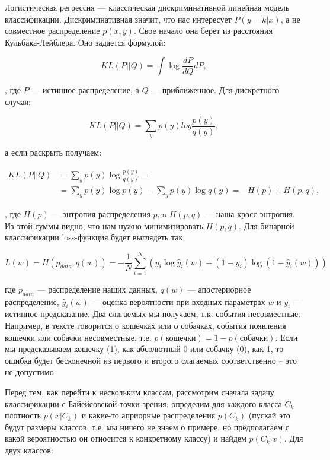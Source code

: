 Логистическая регрессия --- классическая дискриминативной линейная модель классификации. Дискриминативная
значит, что нас интересует $P (y = k | x)$, а не совместное распределение $p (x, y)$. Свое начало она берет из
расстояния Кульбака-Лейблера. Оно задается формулой:

\begin{equation}
 KL(P||Q) = \int\log\frac{dP}{dQ}dP,
\end{equation}

, где $P$ --- истинное распределение, а $Q$ --- приближенное. Для дискретного случая:

\begin{equation}
 KL(P||Q) = \sum_{y} p(y)log\frac{p(y)}{q(y)},
\end{equation}

а если раскрыть получаем:

\begin{equation}
\begin{aligned}
 KL(P||Q) & = \sum_y p(y)\log\frac{p(y)}{q(y)} = \\
 & = \sum_y p(y) \log p(y) - \sum_y p(y) \log q(y) = - H(p) + H(p,q),
\end{aligned}
\end{equation}

, где $H(p)$ ---  энтропия распределения $p$, a $H(p, q)$ --- наша кросс энтропия. Из этой суммы видно, что
нам нужно минимизировать $H(p, q)$. Для бинарной классификации loss-функция будет выглядеть так:

\begin{equation} \label{eq:logLoss}
 L(w)= H(p_{data}, q(w)) = -\frac{1}{N}\sum_{i=1}^N(y_i\log\hat y_i(w) + (1-y_i)\log(1-\hat y_i(w)))
\end{equation}

где $p_{data}$ --- распределение наших данных, $q(w)$ --- апостериорное распределение,  $\hat y_i(w)$ ---
оценка вероятности при входных параметрах $w$ и $y_i$ --- истинное предсказание. Два слагаемых мы получаем,
т.к. события несовместные. Например, в тексте говорится о кошечках или о собачках, события появления кошечки
или собачки несовместные, т.е. $p(\text{кошечки}) = 1 - p(\text{собачки})$. Если мы предсказываем кошечку (1),
как абсолютный 0 или собачку (0), как 1, то ошибка будет бесконечной из первого и второго слагаемых
соответственно -- это не допустимо.

Перед тем, как перейти к нескольким классам, рассмотрим сначала задачу классификации с Байейсовской точки
зрения: определим для каждого класса $C_k$ плотность $p(x|C_k)$ и какие-то априорные распределения $p(C_k)$
(пускай это будут размеры классов, т.е. мы ничего не знаем о примере, но предполагаем с какой вероятностью он
относится к конкретному классу) и найдем $p(C_k|x)$. Для двух классов:

